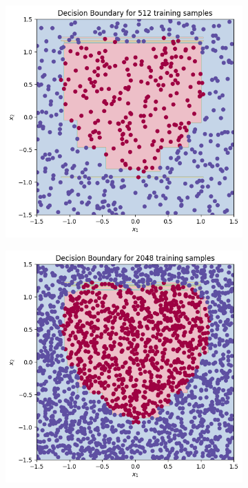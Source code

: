 \documentclass[a4paper]{article}
\theoremstyle{definition}
\newenvironment{soln}{
    \leavevmode\color{blue}\ignorespaces
}{}
\begin{document}
\begin{enumerate}
\begin{itemize}
\begin{soln}
\begin{figure}[H]
\begin{subfigure}{0.5\textwidth}
            \label{fig:q7_128}
        \end{subfigure}
    \end{figure}
    \begin{figure}[H]
        \begin{subfigure}{0.5\textwidth}
            \centering
            \includegraphics[scale=0.4]{Images/Q7/DTq7_512.png}
            \label{fig:q7_512}
        \end{subfigure}%
        \begin{subfigure}{0.5\textwidth}
            \centering
            \includegraphics[scale=0.4]{Images/Q7/DTq7_2048.png}

\end{subfigure}
\end{figure}
\end{soln}
\end{itemize}
\end{enumerate}
\end{document}

